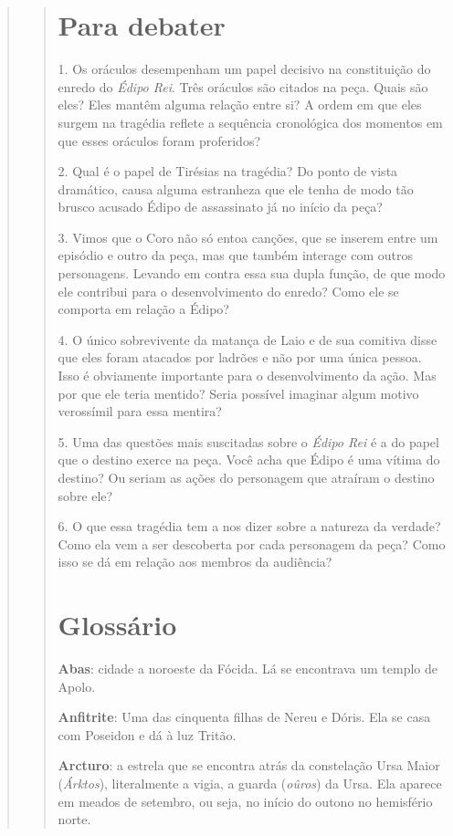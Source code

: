 \begin{verse}
\begin{verse}
\chapter{Para debater}

1. Os oráculos desempenham um papel decisivo na constituição do enredo
do \emph{Édipo Rei}. Três oráculos são citados na peça. Quais são eles?
Eles mantêm alguma relação entre si? A ordem em que eles surgem na
tragédia reflete a sequência cronológica dos momentos em que esses
oráculos foram proferidos?

2. Qual é o papel de Tirésias na tragédia? Do ponto de vista dramático,
causa alguma estranheza que ele tenha de modo tão brusco acusado Édipo
de assassinato já no início da peça?

3. Vimos que o Coro não só entoa canções, que se inserem entre um
episódio e outro da peça, mas que também interage com outros
personagens. Levando em contra essa sua dupla função, de que modo ele
contribui para o desenvolvimento do enredo? Como ele se comporta em
relação a Édipo?

4. O único sobrevivente da matança de Laio e de sua comitiva disse que
eles foram atacados por ladrões e não por uma única pessoa. Isso é
obviamente importante para o desenvolvimento da ação. Mas por que ele
teria mentido? Seria possível imaginar algum motivo verossímil para essa
mentira?

5. Uma das questões mais suscitadas sobre o \emph{Édipo Rei} é a do
papel que o destino exerce na peça. Você acha que Édipo é uma vítima do
destino? Ou seriam as ações do personagem que atraíram o destino sobre
ele?

6. O que essa tragédia tem a nos dizer sobre a natureza da verdade? Como
ela vem a ser descoberta por cada personagem da peça? Como isso se dá em
relação aos membros da audiência?

\chapter{Glossário}

\textbf{Abas}: cidade a noroeste da Fócida. Lá se encontrava um
templo de Apolo.

\textbf{Anfitrite}: Uma das cinquenta filhas de Nereu e Dóris. Ela se
casa com Poseidon e dá à luz Tritão.

\textbf{Arcturo}: a estrela que se encontra atrás da constelação Ursa
Maior (\emph{Árktos}), literalmente a vigia, a guarda (\emph{oûros}) da
Ursa. Ela aparece em meados de setembro, ou seja, no início do outono no
hemisfério norte.


\end{verse}
\end{verse}
